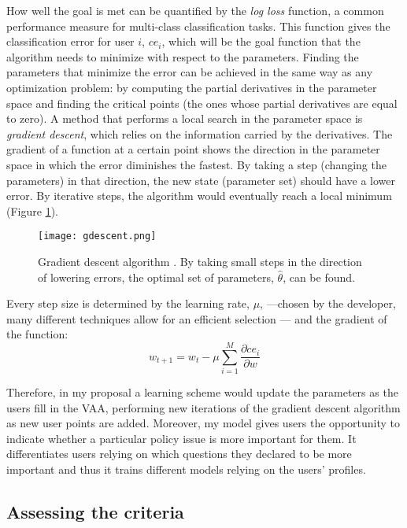 \documentclass{scrartcl}
\begin{document}
How well the goal is met can be quantified by the \textit{log loss} function, a common performance measure for multi-class classification tasks. This function gives  the classification error for user $i$, $ce_i$, which will be the goal function that the algorithm needs to minimize with respect to the parameters. Finding the parameters that minimize the error can be achieved in the same way as any optimization problem: by computing the partial derivatives in the parameter space and finding the critical points (the ones whose partial derivatives are equal to zero). A method that performs a local search in the parameter space is \textit{gradient descent}, which relies on the information carried by the derivatives. The gradient of a function at a certain point shows the direction in the parameter space in which the error diminishes the fastest. By taking a step (changing the parameters) in that direction, the new state (parameter set) should have a lower error. By iterative steps, the algorithm would eventually reach a local minimum (Figure \ref{fig:gdescent}).

\begin{figure}[h]
    \centering 
    \texttt{[image: gdescent.png]}
    \caption{Gradient descent algorithm \cite[Ch. 4]{Geron2017}. By taking small steps in the direction of lowering errors, the optimal set of parameters, $\hat{\theta}$, can be found.}
    \label{fig:gdescent}
\end{figure}

Every step size is determined by the learning rate, $\mu$, ---chosen by the developer, many different techniques allow for an efficient selection \cite[84]{Goodfellow-et-al-2016}--- and the gradient of the function:
\begin{equation}
    w_{t+1} = w_t - \mu \sum_{i=1}^M \frac{\partial ce_i}{\partial w}
\end{equation}

Therefore, in my proposal a learning scheme would update the parameters as the users fill in the VAA, performing new iterations of the gradient descent algorithm as new user points are added. Moreover, my model gives users the opportunity to indicate whether a particular policy issue is more important for them. It differentiates users relying on which questions they declared to be more important and thus it trains different models relying on the users' profiles.

\subsection{Assessing the criteria}
\end{document}
